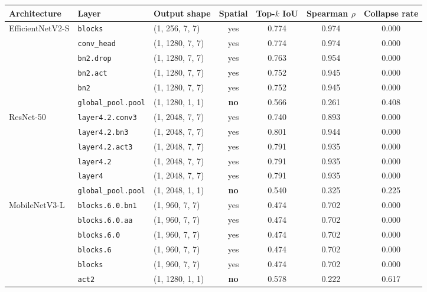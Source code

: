 \begin{tabular}{ll l c ccc}
\toprule
\textbf{Architecture} & \textbf{Layer} & \textbf{Output shape} & \textbf{Spatial} & \textbf{Top-$k$ IoU} & \textbf{Spearman $\rho$} & \textbf{Collapse rate} \\
\midrule
\multirow{6}{*}{EfficientNetV2-S}
 & \texttt{blocks} & (1, 256, 7, 7) & yes & 0.774 & 0.974 & 0.000 \\
 & \texttt{conv\_head} & (1, 1280, 7, 7) & yes & 0.774 & 0.974 & 0.000 \\
 & \texttt{bn2.drop} & (1, 1280, 7, 7) & yes & 0.763 & 0.954 & 0.000 \\
 & \texttt{bn2.act} & (1, 1280, 7, 7) & yes & 0.752 & 0.945 & 0.000 \\
 & \texttt{bn2} & (1, 1280, 7, 7) & yes & 0.752 & 0.945 & 0.000 \\
 & \texttt{global\_pool.pool} & (1, 1280, 1, 1) & \textbf{no} & \cellcolor{quantred!12}0.566 & \cellcolor{quantred!12}0.261 & \cellcolor{quantred!12}0.408 \\
\midrule
\multirow{6}{*}{ResNet-50}
 & \texttt{layer4.2.conv3} & (1, 2048, 7, 7) & yes & 0.740 & 0.893 & 0.000 \\
 & \texttt{layer4.2.bn3} & (1, 2048, 7, 7) & yes & 0.801 & 0.944 & 0.000 \\
 & \texttt{layer4.2.act3} & (1, 2048, 7, 7) & yes & 0.791 & 0.935 & 0.000 \\
 & \texttt{layer4.2} & (1, 2048, 7, 7) & yes & 0.791 & 0.935 & 0.000 \\
 & \texttt{layer4} & (1, 2048, 7, 7) & yes & 0.791 & 0.935 & 0.000 \\
 & \texttt{global\_pool.pool} & (1, 2048, 1, 1) & \textbf{no} & \cellcolor{quantred!12}0.540 & \cellcolor{quantred!12}0.325 & \cellcolor{quantred!12}0.225 \\
\midrule
\multirow{6}{*}{MobileNetV3-L}
 & \texttt{blocks.6.0.bn1} & (1, 960, 7, 7) & yes & 0.474 & 0.702 & 0.000 \\
 & \texttt{blocks.6.0.aa} & (1, 960, 7, 7) & yes & 0.474 & 0.702 & 0.000 \\
 & \texttt{blocks.6.0} & (1, 960, 7, 7) & yes & 0.474 & 0.702 & 0.000 \\
 & \texttt{blocks.6} & (1, 960, 7, 7) & yes & 0.474 & 0.702 & 0.000 \\
 & \texttt{blocks} & (1, 960, 7, 7) & yes & 0.474 & 0.702 & 0.000 \\
 & \texttt{act2} & (1, 1280, 1, 1) & \textbf{no} & \cellcolor{quantred!12}0.578 & \cellcolor{quantred!12}0.222 & \cellcolor{quantred!12}0.617 \\
\bottomrule
\end{tabular}
